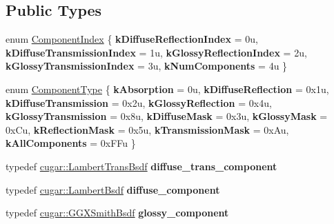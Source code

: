 \subsection*{Public Types}
\begin{DoxyCompactItemize}
\item 
enum \hyperlink{struct_bsdf_acaa87fb810c0f7957db85bf41843f70c}{Component\+Index} \{ \newline
{\bfseries k\+Diffuse\+Reflection\+Index} = 0u, 
{\bfseries k\+Diffuse\+Transmission\+Index} = 1u, 
{\bfseries k\+Glossy\+Reflection\+Index} = 2u, 
{\bfseries k\+Glossy\+Transmission\+Index} = 3u, 
\newline
{\bfseries k\+Num\+Components} = 4u
 \}
\item 
enum \hyperlink{struct_bsdf_a5f7db6f81220ed9ee6da109d6eb5b585}{Component\+Type} \{ \newline
{\bfseries k\+Absorption} = 0u, 
{\bfseries k\+Diffuse\+Reflection} = 0x1u, 
{\bfseries k\+Diffuse\+Transmission} = 0x2u, 
{\bfseries k\+Glossy\+Reflection} = 0x4u, 
\newline
{\bfseries k\+Glossy\+Transmission} = 0x8u, 
{\bfseries k\+Diffuse\+Mask} = 0x3u, 
{\bfseries k\+Glossy\+Mask} = 0x\+Cu, 
{\bfseries k\+Reflection\+Mask} = 0x5u, 
\newline
{\bfseries k\+Transmission\+Mask} = 0x\+Au, 
{\bfseries k\+All\+Components} = 0x\+F\+Fu
 \}
\item 
\mbox{\label{struct_bsdf_a8fff78b20fe6a520fff1c38d1fcaf076}} 
typedef \hyperlink{structcugar_1_1_lambert_trans_bsdf}{cugar\+::\+Lambert\+Trans\+Bsdf} {\bfseries diffuse\+\_\+trans\+\_\+component}
\item 
\mbox{\label{struct_bsdf_aa53ce614ace7c6ddf9978eeb5220742d}} 
typedef \hyperlink{structcugar_1_1_lambert_bsdf}{cugar\+::\+Lambert\+Bsdf} {\bfseries diffuse\+\_\+component}
\item 
\mbox{\label{struct_bsdf_a3def52151a6e63eac581255adb247e13}} 
typedef \hyperlink{structcugar_1_1_g_g_x_smith_bsdf}{cugar\+::\+G\+G\+X\+Smith\+Bsdf} {\bfseries glossy\+\_\+component}
\end{DoxyCompactItemize}
